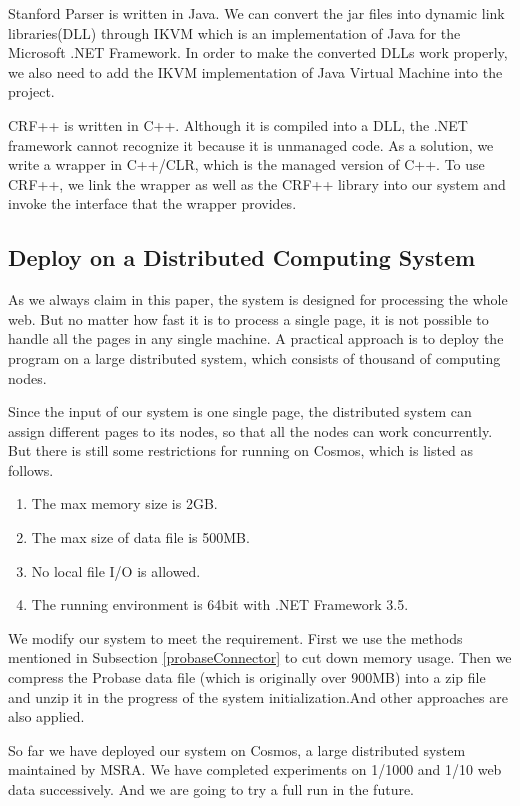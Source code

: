 Stanford Parser is written in Java.
We can convert the jar files into dynamic link libraries(DLL) through IKVM\cite{ikvmWebsite} which is an implementation of Java for the Microsoft .NET Framework.
In order to make the converted DLLs work properly, we also need to add the IKVM implementation of Java Virtual Machine into the project.

CRF++ is written in C++. Although it is compiled into a DLL, the .NET framework cannot recognize it because it is unmanaged code. As a solution, we write a wrapper in C++/CLR, which is the managed version of C++. To use CRF++, we link the wrapper as well as the CRF++ library into our system and invoke the interface that the wrapper provides.

\subsection{Deploy on a Distributed Computing System}
As we always claim in this paper, the system is designed for processing the whole web. But no matter how fast it is to process a single page, it is not possible to handle all the pages in any single machine. A practical approach is to deploy the program on a large distributed system, which consists of thousand of computing nodes.

Since the input of our system is one single page, the distributed system can assign different pages to its nodes, so that all the nodes can work concurrently.
But there is still some restrictions for running on Cosmos, which is listed as follows.
\begin{enumerate}
  \item The max memory size is 2GB.
  \item The max size of data file is 500MB.
  \item No local file I/O is allowed.
  \item The running environment is 64bit with .NET Framework 3.5.
\end{enumerate}

We modify our system to meet the requirement. First we use the methods mentioned in Subsection \ref{probaseConnector} to cut down memory usage. Then we compress the Probase data file (which is originally over 900MB) into a zip file and unzip it in the progress of the system initialization.And other approaches are also applied.

So far we have deployed our system on Cosmos, a large distributed system maintained by MSRA. We have completed experiments on 1/1000 and 1/10 web data successively. And we are going to try a full run in the future.



